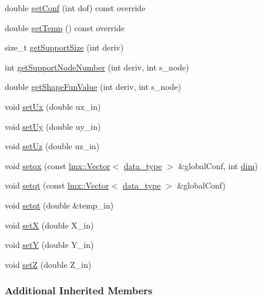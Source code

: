 \begin{DoxyCompactItemize}
\item 
double \hyperlink{classmknix_1_1_node_a76f9fcdbffb3561d29c3536ba3511bf7}{get\+Conf} (int dof) const override
\item 
double \hyperlink{classmknix_1_1_node_a32945afdc1caaab1456bbd286ba807c9}{get\+Temp} () const override
\item 
size\+\_\+t \hyperlink{classmknix_1_1_node_aaa7a577ee98149ca2b82711e4aa0e77a}{get\+Support\+Size} (int deriv)
\item 
int \hyperlink{classmknix_1_1_node_a209f5158efc66c282da2be880535c392}{get\+Support\+Node\+Number} (int deriv, int s\+\_\+node)
\item 
double \hyperlink{classmknix_1_1_node_a6051733b173a21813c1d111ae18f0e61}{get\+Shape\+Fun\+Value} (int deriv, int s\+\_\+node)
\item 
void \hyperlink{classmknix_1_1_node_adfbc2fbcbf12becd4a498cbdc6d85cb3}{set\+Ux} (double ux\+\_\+in)
\item 
void \hyperlink{classmknix_1_1_node_a76378e1cb2f9d9021d44789e85a75012}{set\+Uy} (double uy\+\_\+in)
\item 
void \hyperlink{classmknix_1_1_node_a522e185e16432892a3cee169b442035d}{set\+Uz} (double uz\+\_\+in)
\item 
void \hyperlink{classmknix_1_1_node_a24a4f70c0ac083a3ba34c5a9cbc393bb}{setqx} (const \hyperlink{classlmx_1_1_vector}{lmx\+::\+Vector}$<$ \hyperlink{namespacemknix_a16be4b246fbf2cceb141e3a179111020}{data\+\_\+type} $>$ \&global\+Conf, int \hyperlink{classmknix_1_1_point_ab97e4bca7f299237ff3f8cc2449b1be1}{dim})
\item 
void \hyperlink{classmknix_1_1_node_ac17cbcbdad071a2bfd9638f3c6891eb6}{setqt} (const \hyperlink{classlmx_1_1_vector}{lmx\+::\+Vector}$<$ \hyperlink{namespacemknix_a16be4b246fbf2cceb141e3a179111020}{data\+\_\+type} $>$ \&global\+Conf)
\item 
void \hyperlink{classmknix_1_1_node_a482ac2f9d2684a9267164c6333a8f1e3}{setqt} (double \&temp\+\_\+in)
\item 
void \hyperlink{classmknix_1_1_node_aac32e597e1ec0bb85fabcbd2f14d0348}{set\+X} (double X\+\_\+in)
\item 
void \hyperlink{classmknix_1_1_node_acd17b4ac110feaa43430839b6aad107b}{set\+Y} (double Y\+\_\+in)
\item 
void \hyperlink{classmknix_1_1_node_aa294c096ab343766756ca8e5c6ec7f26}{set\+Z} (double Z\+\_\+in)
\end{DoxyCompactItemize}
\subsubsection*{Additional Inherited Members}



